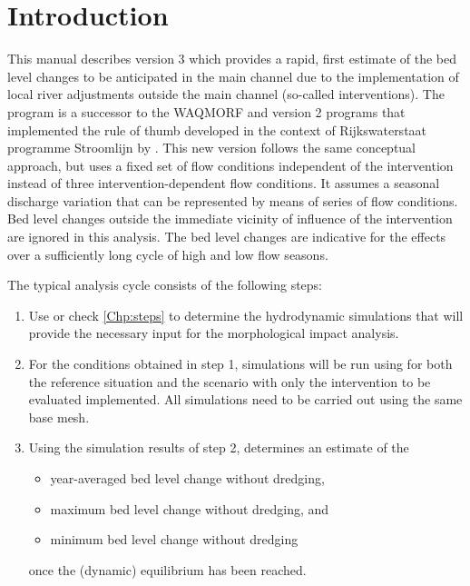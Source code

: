 \chapter{Introduction}

This manual describes \dfastmi version 3 which provides a rapid, first estimate of the bed level changes to be anticipated in the main channel due to the implementation of local river adjustments outside the main channel (so-called interventions).
The program is a successor to the WAQMORF and \dfastmi version 2 programs that implemented the rule of thumb developed in the context of Rijkswaterstaat programme Stroomlijn by \citep{Sieben2008}.
This new version follows the same conceptual approach, but uses a fixed set of flow conditions independent of the intervention instead of three intervention-dependent flow conditions.
It assumes a seasonal discharge variation that can be represented by means of series of flow conditions.
Bed level changes outside the immediate vicinity of influence of the intervention are ignored in this analysis.
The bed level changes are indicative for the effects over a sufficiently long cycle of high and low flow seasons.

The typical analysis cycle consists of the following steps:

\begin{enumerate}
\item Use \dfastmi or check \autoref{Chp:steps} to determine the hydrodynamic simulations that will provide the necessary input for the morphological impact analysis.

\item For the conditions obtained in step 1, simulations will be run using \dflowfm for both the reference situation and the scenario with only the intervention to be evaluated implemented.
All simulations need to be carried out using the same base mesh.

\item Using the simulation results of step 2, \dfastmi determines an estimate of the
\begin{itemize}
\item year-averaged bed level change \unitbrackets{\SI{}{\metre}} without dredging,
\item maximum bed level change \unitbrackets{\SI{}{\metre}} without dredging, and
\item minimum bed level change \unitbrackets{\SI{}{\metre}} without dredging
\end{itemize}
once the (dynamic) equilibrium has been reached.
\end{enumerate}

